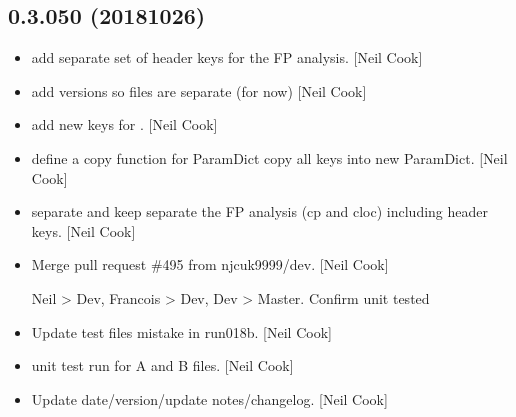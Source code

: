 \documentclass[a4paper,10pt,english]{report}
\begin{document}
\subsection{0.3.050 (2018\sphinxhyphen{}10\sphinxhyphen{}26)}
\label{\detokenize{misc/changelog:id301}}\begin{itemize}
\item {} 
 \sphinxhyphen{} add separate set of header keys for the FP
analysis. {[}Neil Cook{]}

\item {} 
 \sphinxhyphen{} add  versions so files are separate (for now)
{[}Neil Cook{]}

\item {} 
 \sphinxhyphen{} add new keys for . {[}Neil Cook{]}

\item {} 
 \sphinxhyphen{} define a copy function for ParamDict \sphinxhyphen{} copy all keys
into new ParamDict. {[}Neil Cook{]}

\item {} 
 \sphinxhyphen{} separate and keep separate the FP analysis
(cp and cloc) \sphinxhyphen{} including header keys. {[}Neil Cook{]}

\item {} 
Merge pull request \#495 from njcuk9999/dev. {[}Neil Cook{]}

Neil \textendash{}\textgreater{} Dev, Francois \textendash{}\textgreater{} Dev, Dev \textendash{}\textgreater{} Master. Confirm unit tested

\item {} 
Update test files \sphinxhyphen{} mistake in run018b. {[}Neil Cook{]}

\item {} 
 \sphinxhyphen{} unit test run for A and B files. {[}Neil Cook{]}

\item {} 
Update date/version/update notes/changelog. {[}Neil Cook{]}

\end{itemize}
\end{document}
